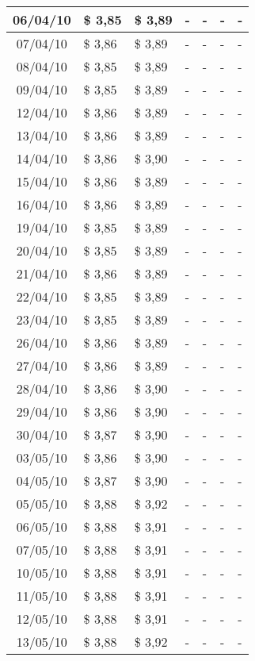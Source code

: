 \begin{center}
\begin{longtable}{|c|p{1.5cm}|p{1.5cm}|p{1.5cm}|p{1.5cm}|p{1.5cm}|p{1.5cm}|}
06/04/10 & \$ 3,85 & \$ 3,89 & - & - & - & - \\ \hline
07/04/10 & \$ 3,86 & \$ 3,89 & - & - & - & - \\ \hline
08/04/10 & \$ 3,85 & \$ 3,89 & - & - & - & - \\ \hline
09/04/10 & \$ 3,85 & \$ 3,89 & - & - & - & - \\ \hline
12/04/10 & \$ 3,86 & \$ 3,89 & - & - & - & - \\ \hline
13/04/10 & \$ 3,86 & \$ 3,89 & - & - & - & - \\ \hline
14/04/10 & \$ 3,86 & \$ 3,90 & - & - & - & - \\ \hline
15/04/10 & \$ 3,86 & \$ 3,89 & - & - & - & - \\ \hline
16/04/10 & \$ 3,86 & \$ 3,89 & - & - & - & - \\ \hline
19/04/10 & \$ 3,85 & \$ 3,89 & - & - & - & - \\ \hline
20/04/10 & \$ 3,85 & \$ 3,89 & - & - & - & - \\ \hline
21/04/10 & \$ 3,86 & \$ 3,89 & - & - & - & - \\ \hline
22/04/10 & \$ 3,85 & \$ 3,89 & - & - & - & - \\ \hline
23/04/10 & \$ 3,85 & \$ 3,89 & - & - & - & - \\ \hline
26/04/10 & \$ 3,86 & \$ 3,89 & - & - & - & - \\ \hline
27/04/10 & \$ 3,86 & \$ 3,89 & - & - & - & - \\ \hline
28/04/10 & \$ 3,86 & \$ 3,90 & - & - & - & - \\ \hline
29/04/10 & \$ 3,86 & \$ 3,90 & - & - & - & - \\ \hline
30/04/10 & \$ 3,87 & \$ 3,90 & - & - & - & - \\ \hline
03/05/10 & \$ 3,86 & \$ 3,90 & - & - & - & - \\ \hline
04/05/10 & \$ 3,87 & \$ 3,90 & - & - & - & - \\ \hline
05/05/10 & \$ 3,88 & \$ 3,92 & - & - & - & - \\ \hline
06/05/10 & \$ 3,88 & \$ 3,91 & - & - & - & - \\ \hline
07/05/10 & \$ 3,88 & \$ 3,91 & - & - & - & - \\ \hline
10/05/10 & \$ 3,88 & \$ 3,91 & - & - & - & - \\ \hline
11/05/10 & \$ 3,88 & \$ 3,91 & - & - & - & - \\ \hline
12/05/10 & \$ 3,88 & \$ 3,91 & - & - & - & - \\ \hline
13/05/10 & \$ 3,88 & \$ 3,92 & - & - & - & - \\ \hline

\end{longtable}
\end{center}
